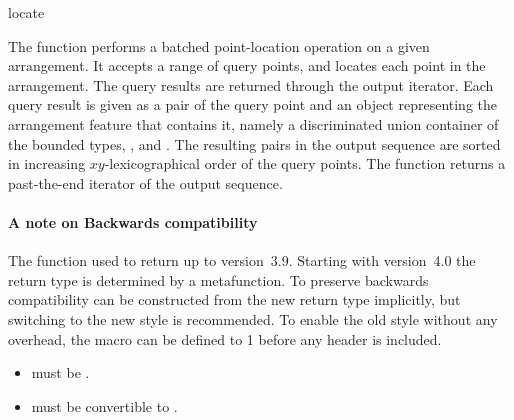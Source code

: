 \ccRefPageBegin

\begin{ccRefFunction}{locate}

\ccDefinition

The function \ccRefName{} performs a batched point-location operation on a
given arrangement. It accepts a range of query points, and locates each
point in the arrangement. The query results are returned through the output
iterator. Each query result is given as a pair of the query point and an
object representing the arrangement feature that contains it, namely a
discriminated union container of the bounded types,
, and . The resulting
pairs in the output sequence are sorted in increasing $xy$-lexicographical
order of the query points. The function returns a past-the-end iterator of
the output sequence.

\paragraph{A note on Backwards compatibility}
The function \ccRefName{} used to return  up to
\cgal{} version~3.9. Starting with \cal{} version~4.0 the return type
is determined by a metafunction. To preserve backwards compatibility
 can be constructed from the new return type
implicitly, but switching to the new style is recommended. To enable
the old style without any overhead, the macro
 can be defined to 1 before any
\cgal{} header is included.



\ccRequirements
\begin{itemize}
\item {} must be .
\item {} must be convertible to
  .
\end{itemize}

\ccSeeAlso
\\

\end{ccRefFunction}

\ccRefPageEnd
